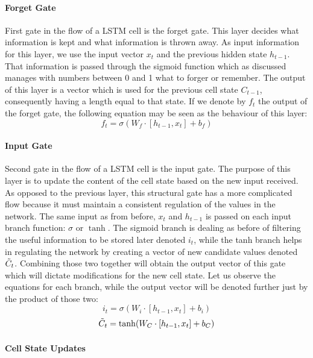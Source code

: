 \paragraph{Forget Gate}\mbox{} 

\vspace{5mm}

First gate in the flow of a LSTM cell is the forget gate. This layer decides what information is kept and what information is thrown away. As input information for this layer, we use the input vector $\displaystyle x_t$ and the previous hidden state $\displaystyle h_{t-1}$. That information is passed through the sigmoid function which as discussed manages with numbers between 0 and 1 what to forger or remember. The output of this layer is a vector which is used for the previous cell state $\displaystyle C_{t-1}$, consequently having a length equal to that state. If we denote by $\displaystyle f_t$ the output of the forget gate, the following equation may be seen as the behaviour of this layer:
\[ f_t = \sigma(W_f\cdot[h_{t-1}, x_t] + b_f) \]

\paragraph{Input Gate}\mbox{} 

\vspace{5mm}

Second gate in the flow of a LSTM cell is the input gate. The purpose of this layer is to update the content of the cell state based on the new input received. As opposed to the previous layer, this structural gate has a more complicated flow because it must maintain a consistent regulation of the values in the network. The same input as from before, $\displaystyle x_t$ and $\displaystyle h_{t-1}$ is passed on each input branch function: $\displaystyle \sigma$ or $\displaystyle \tanh$. The sigmoid branch is dealing as before of filtering the useful information to be stored later denoted $\displaystyle i_t$, while the tanh branch helps in regulating the network by creating a vector of new candidate values denoted $\displaystyle \Tilde{C}_t$. Combining those two together will obtain the output vector of this gate which will dictate modifications for the new cell state. Let us observe the equations for each branch, while the output vector will be denoted further just by the product of those two:
\[ i_t = \sigma(W_i\cdot[h_{t-1}, x_t] + b_i)\]
\[ \Tilde{C}_t = \tanh(W_C\cdot[h_{t-1}, x_t] + b_C)\]

\paragraph{Cell State Updates}\mbox{} 

